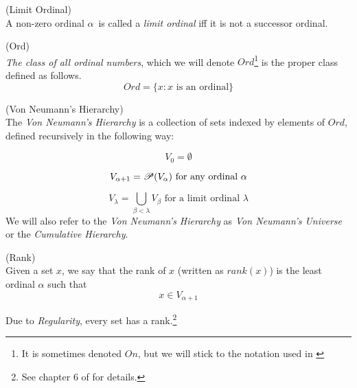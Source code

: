 \begin{definition}{(Limit Ordinal)}\label{def:limit_ordinal}\\ %
A non-zero ordinal $\alpha$ is called a \emph{limit ordinal} iff it is not a successor ordinal.
\end{definition}

\begin{definition}{(Ord)}\label{def:ord}\\  %
\emph{The class of all ordinal numbers}, which we will denote $Ord$\footnote{It is sometimes denoted $On$, but we will stick to the notation used in \cite{JechBook}} is the proper class defined as follows.
\begin{equation}
Ord = \{x : x\mbox{ is an ordinal}\}
\end{equation}
\end{definition}


\begin{definition}{(Von Neumann's Hierarchy)}\label{def:von_neumann}\\ %
The \emph{Von Neumann's Hierarchy} is a collection of sets indexed by elements of $Ord$, defined recursively in the following way:
\bce[(i)]
\item 
\begin{equation}
V_0 = \emptyset
\end{equation}
\item 
\begin{equation}
V_{\alpha+1} = \mathscr{P} (V_\alpha)\mbox{ for any ordinal $\alpha$}
\end{equation}
\item
\begin{equation} 
V_\lambda = \bigcup_{\beta < \lambda} V_\beta \mbox{ for a limit ordinal $\lambda$}
\end{equation}
\ece
We will also refer to the \emph{Von Neumann's Hierarchy} as \emph{Von Neumann's Universe} or the \emph{Cumulative Hierarchy}. %
\end{definition}

\begin{definition}{(Rank)}\label{def:rank}\\ %
Given a set $x$, we say that the rank of $x$ (written as $rank(x)$) is the least ordinal $\alpha$ such that
\begin{equation}
x \in V_{\alpha+1}
\end{equation}
\end{definition}
Due to \emph{Regularity}, every set has a rank.\footnote{See chapter 6 of \cite{JechBook} for details.}

